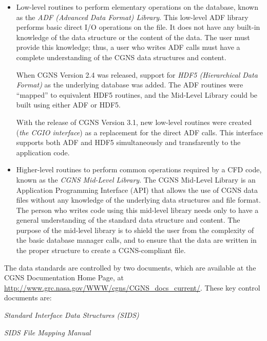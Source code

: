 \begin{itemize}
\item Low-level routines to perform elementary operations on the
     database, known as the \textit{ADF (Advanced Data Format) Library}.
     This low-level ADF library performs basic direct I/O operations on
     the file.
     It does not have any built-in knowledge of the data structure or
     the content of the data.
     The user must provide this knowledge; thus, a user who writes
     ADF calls must have a complete understanding of the CGNS data
     structures and content.

      When CGNS Version 2.4 was released, support for
      \textit{HDF5 (Hierarchical Data Format)}
      as the underlying database was added.
      The ADF routines were ``mapped'' to equivalent HDF5
      routines, and the Mid-Level Library could be built using
      either ADF or HDF5.

      With the release of CGNS Version 3.1, new low-level routines
      were created (\textit{the CGIO interface})
      as a replacement for the direct ADF calls. This interface supports
      both ADF and HDF5 simultaneously
      and transfarently to the application code.
\item Higher-level routines to perform common operations required by a
      CFD code, known as the \textit{CGNS Mid-Level Library}.
      The CGNS Mid-Level Library is an Application Programming Interface
      (API) that allows the use of CGNS data files without any knowledge
      of the underlying data structures and file format.
      The person who writes code using this mid-level library needs only
      to have a general understanding of the standard data structure and
      content.
      The purpose of the mid-level library is to shield the user from
      the complexity of the basic database manager calls,
      and to ensure that the data
      are written in the proper structure to create a CGNS-compliant
      file.
\end{itemize}

The data standards are controlled by two documents, which are available
at the CGNS Documentation Home Page, at
\url{http://www.grc.nasa.gov/WWW/cgns/CGNS_docs_current/}.
These key control documents are:

\begin{itemize*}
\item \textit{Standard Interface Data Structures (SIDS)}
\item \textit{SIDS File Mapping Manual}
\end{itemize*}

